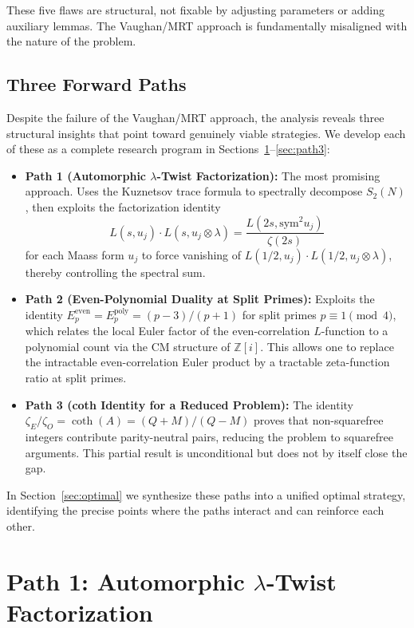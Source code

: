 \documentclass[11pt,a4paper]{article}
\theoremstyle{plain}
\theoremstyle{definition}
\newcommand{\sym}{\mathrm{sym}}
\newcommand{\ZZ}{\mathbb{Z}}
\begin{document}
These five flaws are structural, not fixable by adjusting parameters or adding auxiliary lemmas. The Vaughan/MRT approach is fundamentally misaligned with the nature of the problem.

\subsection{Three Forward Paths}
\label{subsec:three-paths}

Despite the failure of the Vaughan/MRT approach, the analysis reveals three structural insights that point toward genuinely viable strategies. We develop each of these as a complete research program in Sections~\ref{sec:path1}--\ref{sec:path3}:

\begin{itemize}
\item \textbf{Path 1 (Automorphic $\lambda$-Twist Factorization):} The most promising approach. Uses the Kuznetsov trace formula to spectrally decompose $S_2(N)$, then exploits the factorization identity
\[
L(s, u_j) \cdot L(s, u_j \otimes \lambda) = \frac{L(2s, \sym^2 u_j)}{\zeta(2s)}
\]
for each Maass form $u_j$ to force vanishing of $L(1/2, u_j) \cdot L(1/2, u_j \otimes \lambda)$, thereby controlling the spectral sum.

\item \textbf{Path 2 (Even-Polynomial Duality at Split Primes):} Exploits the identity $E_p^{\mathrm{even}} = E_p^{\mathrm{poly}} = (p-3)/(p+1)$ for split primes $p \equiv 1 \pmod{4}$, which relates the local Euler factor of the even-correlation $L$-function to a polynomial count via the CM structure of $\ZZ[i]$. This allows one to replace the intractable even-correlation Euler product by a tractable zeta-function ratio at split primes.

\item \textbf{Path 3 (coth Identity for a Reduced Problem):} The identity $\zeta_E/\zeta_O = \coth(A) = (Q+M)/(Q-M)$ proves that non-squarefree integers contribute parity-neutral pairs, reducing the problem to squarefree arguments. This partial result is unconditional but does not by itself close the gap.
\end{itemize}

In Section~\ref{sec:optimal} we synthesize these paths into a unified optimal strategy, identifying the precise points where the paths interact and can reinforce each other.


\section{Path 1: Automorphic $\lambda$-Twist Factorization}
\label{sec:path1}
\end{document}
